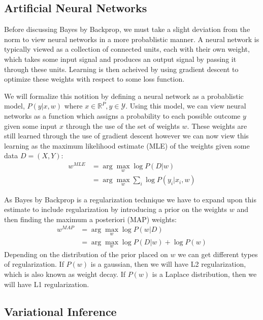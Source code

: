 \documentclass[11pt]{article}
\begin{document}
\subsection{Artificial Neural Networks}
Before discussing Bayes by Backprop, we must take a slight deviation from
the norm to view neural networks in a more probablistic manner. A neural 
network is typically viewed as a collection of connected units, each with 
their own weight, which takes some input signal and produces an output
signal by passing it through these units. Learning is then acheived by 
using gradient descent to optimize these weights with respect to some loss
function. 

We will formalize this notition by defining a neural network as a probablistic
model, $P(y|x,w)$ where $x \in \mathbb{R}^P, y \in \mathcal{Y}$. Using this 
model, we can view neural networks as a function which assigns a probability
to each possible outcome $y$ given some input $x$ through the use of the set
of weights $w$. These weights are still learned through the use of gradient 
descent however we can now view this learning as the maximum likelihood 
estimate (MLE) of the weights given some data $D=(X,Y)$:
\begin{align*}
  w^{MLE} &= \arg\max_w \log P(D|w) \\ 
  &= \arg\max_w \sum_i \log P(y_i|x_i, w) 
\end{align*}

As Bayes by Backprop is a regularization technique we have to expand upon this
estimate to include regularization by introducing a prior on the weights $w$ 
and then finding the maximum a posteriori (MAP) weights:
\begin{align*}
  w^{MAP} &= \arg\max_w \log P(w|D) \\
  &= \arg\max_w \log P(D|w) + \log P(w) 
\end{align*}
Depending on the distribution of the prior placed on $w$ we can get different
types of regularization. If $P(w)$ is a gaussian, then we will have L2 
regularization, which is also known as weight decay. If $P(w)$ is a
Laplace distribution, then we will have L1 regularization.


\subsection{Variational Inference}

\end{document}
